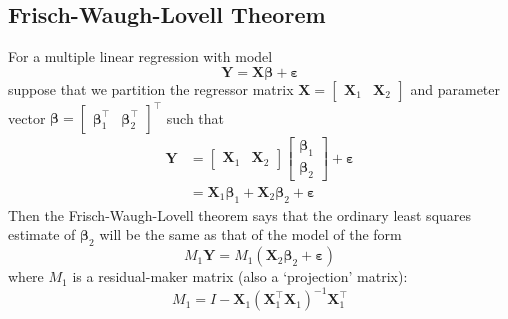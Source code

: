 \documentclass[11pt]{report} %
\begin{document}
\subsection{Frisch-Waugh-Lovell Theorem \cite{Greene2012}}

For a multiple linear regression with model
\begin{equation}
\mathbf{Y} = \mathbf{X}\boldsymbol{\beta} + \boldsymbol{\varepsilon}
\end{equation}
suppose that we partition the regressor matrix $\mathbf{X} = \begin{bmatrix} \mathbf{X}_{1} & \mathbf{X}_{2} \end{bmatrix}$ and parameter vector $\boldsymbol{\beta} = \begin{bmatrix} \boldsymbol{\beta}_{1}^{\top} & \boldsymbol{\beta}_{2}^{\top}\end{bmatrix}^{\top}$ such that
\begin{align}
\mathbf{Y} &= \begin{bmatrix} \mathbf{X}_{1} & \mathbf{X}_{2} \end{bmatrix}\begin{bmatrix} \boldsymbol{\beta}_{1} \\ \boldsymbol{\beta}_{2}\end{bmatrix} + \boldsymbol{\varepsilon} \\
&= \mathbf{X}_{1}\boldsymbol{\beta}_{1} + \mathbf{X}_{2}\boldsymbol{\beta}_{2} + \boldsymbol{\varepsilon}
\end{align}
Then the Frisch-Waugh-Lovell theorem says that the ordinary least squares estimate of $\boldsymbol{\beta}_{2}$ will be the same as that of the model of the form
\begin{equation}
M_{1}\mathbf{Y} = M_{1}\left(\mathbf{X}_{2}\boldsymbol{\beta}_{2} + \boldsymbol{\varepsilon}\right)
\end{equation}
where $M_{1}$ is a residual-maker matrix (also a `projection' matrix):
\begin{equation}
M_{1} = I - \mathbf{X}_{1}\left(\mathbf{X}_{1}^{\top}\mathbf{X}_{1}\right)^{-1}\mathbf{X}_{1}^{\top}
\end{equation}
\end{document}
